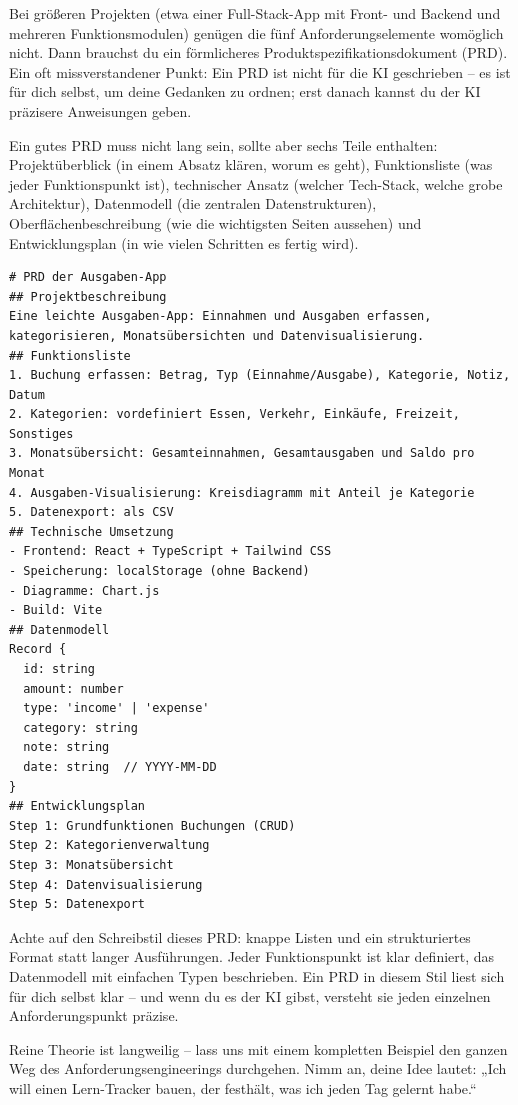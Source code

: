 Bei größeren Projekten (etwa einer Full-Stack-App mit Front- und Backend und mehreren Funktionsmodulen) genügen die fünf Anforderungselemente womöglich nicht. Dann brauchst du ein förmlicheres Produktspezifikationsdokument (PRD). Ein oft missverstandener Punkt: Ein PRD ist nicht für die KI geschrieben – es ist für dich selbst, um deine Gedanken zu ordnen; erst danach kannst du der KI präzisere Anweisungen geben.

Ein gutes PRD muss nicht lang sein, sollte aber sechs Teile enthalten: Projektüberblick (in einem Absatz klären, worum es geht), Funktionsliste (was jeder Funktionspunkt ist), technischer Ansatz (welcher Tech-Stack, welche grobe Architektur), Datenmodell (die zentralen Datenstrukturen), Oberflächenbeschreibung (wie die wichtigsten Seiten aussehen) und Entwicklungsplan (in wie vielen Schritten es fertig wird).

\begin{lstlisting}
# PRD der Ausgaben-App
## Projektbeschreibung
Eine leichte Ausgaben-App: Einnahmen und Ausgaben erfassen, kategorisieren, Monatsübersichten und Datenvisualisierung.
## Funktionsliste
1. Buchung erfassen: Betrag, Typ (Einnahme/Ausgabe), Kategorie, Notiz, Datum
2. Kategorien: vordefiniert Essen, Verkehr, Einkäufe, Freizeit, Sonstiges
3. Monatsübersicht: Gesamteinnahmen, Gesamtausgaben und Saldo pro Monat
4. Ausgaben-Visualisierung: Kreisdiagramm mit Anteil je Kategorie
5. Datenexport: als CSV
## Technische Umsetzung
- Frontend: React + TypeScript + Tailwind CSS
- Speicherung: localStorage (ohne Backend)
- Diagramme: Chart.js
- Build: Vite
## Datenmodell
Record {
  id: string
  amount: number
  type: 'income' | 'expense'
  category: string
  note: string
  date: string  // YYYY-MM-DD
}
## Entwicklungsplan
Step 1: Grundfunktionen Buchungen (CRUD)
Step 2: Kategorienverwaltung
Step 3: Monatsübersicht
Step 4: Datenvisualisierung
Step 5: Datenexport
\end{lstlisting}

Achte auf den Schreibstil dieses PRD: knappe Listen und ein strukturiertes Format statt langer Ausführungen. Jeder Funktionspunkt ist klar definiert, das Datenmodell mit einfachen Typen beschrieben. Ein PRD in diesem Stil liest sich für dich selbst klar – und wenn du es der KI gibst, versteht sie jeden einzelnen Anforderungspunkt präzise.


Reine Theorie ist langweilig – lass uns mit einem kompletten Beispiel den ganzen Weg des Anforderungsengineerings durchgehen. Nimm an, deine Idee lautet: „Ich will einen Lern-Tracker bauen, der festhält, was ich jeden Tag gelernt habe.“


